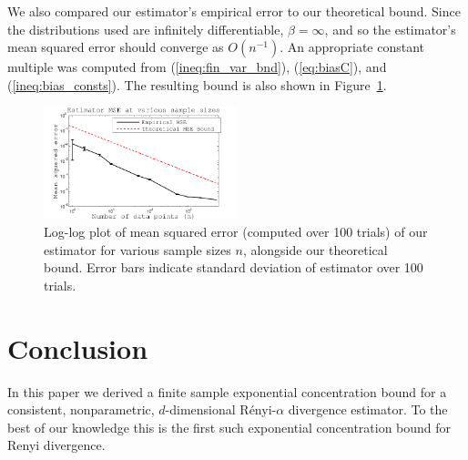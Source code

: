 \documentclass{article}
\newcommand{\inv}{^{-1}}                            %
\begin{document}
We also compared our estimator's empirical error to our theoretical bound.
Since the distributions used are infinitely differentiable, $\beta = \infty$,
and so the estimator's mean squared error should converge as $O(n\inv)$. An
appropriate constant multiple was computed from (\ref{ineq:fin_var_bnd}),
(\ref{eq:biasC}), and (\ref{ineq:bias_consts}). The resulting bound is also
shown in Figure~\ref{fig:MSE}.
\begin{figure}[h!]
\begin{center}
\includegraphics[width=0.5\textwidth]{MSE}
\end{center}
\vspace{-3mm}
\caption{Log-log plot of mean squared error (computed over 100 trials) of our
estimator for various sample sizes $n$, alongside our theoretical bound. Error
bars indicate standard deviation of estimator over 100 trials.}
\label{fig:MSE}
\end{figure}
\vspace{-5mm}
\section{Conclusion} \label{sec:Conclusion}
In this paper we derived a finite sample exponential concentration bound for a
consistent, nonparametric, $d$-dimensional R\'enyi-$\alpha$ divergence
estimator. To the best of our knowledge this is the first such exponential
concentration bound for Renyi divergence.
 


\end{document}
